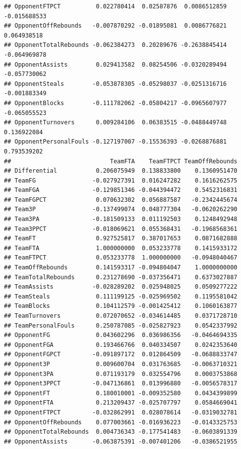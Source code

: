 \documentclass[]{book}
\begin{document}
\begin{verbatim}
## OpponentFTPCT          0.022780414  0.02587876  0.0086512859 -0.015688533
## OpponentOffRebounds   -0.007870292 -0.01895081  0.0086776821  0.064938518
## OpponentTotalRebounds -0.062384273  0.20289676 -0.2638845414 -0.064969878
## OpponentAssists        0.029413582  0.08254506 -0.0320289494 -0.057730062
## OpponentSteals        -0.053878305 -0.05298037 -0.0251316716 -0.001883349
## OpponentBlocks        -0.111782062 -0.05804217 -0.0965607977 -0.065055523
## OpponentTurnovers      0.009284106  0.06383515 -0.0488449748  0.136922084
## OpponentPersonalFouls -0.127197007 -0.15536393 -0.0268876881  0.793539202
##                            TeamFTA    TeamFTPCT TeamOffRebounds
## Differential           0.206075949  0.138833800    0.1360951470
## TeamFG                -0.027927391  0.016247282    0.1616262575
## TeamFGA               -0.129851346 -0.044394472    0.5452316831
## TeamFGPCT              0.070632302  0.056887587   -0.2342445674
## Team3P                -0.137499074  0.048777304   -0.0620262290
## Team3PA               -0.181509133  0.011192503    0.1248492948
## Team3PPCT             -0.018069621  0.055368431   -0.1968568361
## TeamFT                 0.927525817  0.387017653    0.0871682888
## TeamFTA                1.000000000  0.053233778    0.1415933172
## TeamFTPCT              0.053233778  1.000000000   -0.0948040467
## TeamOffRebounds        0.141593317 -0.094804047    1.0000000000
## TeamTotalRebounds      0.231278690 -0.037356471    0.6373027887
## TeamAssists           -0.028289202  0.025948025    0.0509277222
## TeamSteals             0.111199125 -0.025969502    0.1195581042
## TeamBlocks             0.104112579 -0.001425412    0.1060163877
## TeamTurnovers          0.072070652 -0.034614485    0.0371728710
## TeamPersonalFouls      0.250787085 -0.025827923    0.0542337992
## OpponentFG             0.043602296  0.036986356   -0.0464694335
## OpponentFGA            0.193466766  0.040334507    0.0242353640
## OpponentFGPCT         -0.091897172  0.012864509   -0.0688833747
## Opponent3P             0.009600704  0.031763685   -0.0063710321
## Opponent3PA            0.071193179  0.032554796    0.0003753868
## Opponent3PPCT         -0.047136861  0.013996880   -0.0056578317
## OpponentFT             0.180010001 -0.009352580    0.0434399899
## OpponentFTA            0.213209437 -0.025707797    0.0584669041
## OpponentFTPCT         -0.032862991  0.028078614   -0.0319032781
## OpponentOffRebounds    0.077003661 -0.016936223   -0.0143325753
## OpponentTotalRebounds  0.004736343 -0.177541483   -0.0603891339
## OpponentAssists       -0.063875391 -0.007401206   -0.0386521955

\end{verbatim}
\end{document}

